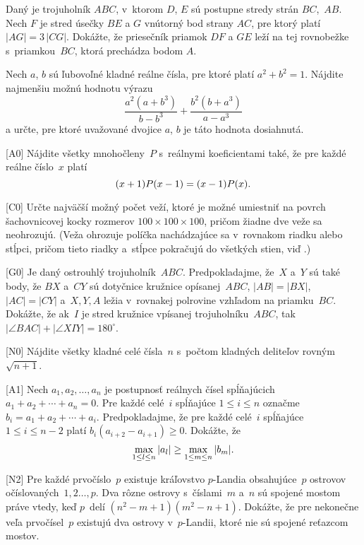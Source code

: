 {%
Daný je trojuholník $ABC$, v~ktorom $D$, $E$ sú postupne stredy
strán $BC$,~$AB$. Nech $F$ je stred úsečky $BE$
a $G$ vnútorný bod strany $AC$, pre ktorý platí $|AG|=3\,|CG|$.
Dokážte, že priesečník priamok $DF$ a $GE$ leží na tej rovnobežke
s~priamkou~$BC$, ktorá prechádza bodom $A$.
}

{%
Nech $a$, $b$ sú ľubovoľné kladné reálne čísla, pre ktoré platí $a^2+b^2=1$.
Nájdite najmenšiu možnú hodnotu výrazu
$$
\frac{a^2(a+b^3)}{b-b^3}+\frac{b^2(b+a^3)}{a-a^3}
$$
a určte, pre ktoré uvažované dvojice $a$, $b$ je táto hodnota dosiahnutá.}

{%
[A0]
Nájdite všetky mnohočleny~$P$ s~reálnymi koeficientami také, že pre každé reálne číslo~$x$ platí
$$
(x+1)P(x-1) = (x-1)P(x).
\belowdisplayskip0pt
$$}

{%
[C0]
Určte najväčší možný počet veží, ktoré je možné umiestniť na povrch šachovnicovej kocky rozmerov $100 \times 100 \times 100$, pričom žiadne dve veže sa neohrozujú. (Veža ohrozuje políčka nachádzajúce sa v~rovnakom riadku alebo stĺpci, pričom tieto riadky a~stĺpce pokračujú do všetkých stien, viď \obr.)
%
}

{%
[G0]
Je daný ostrouhlý trojuholník~$ABC$. Predpokladajme, že~$X$ a~$Y$ sú také body, že $BX$ a~$CY$ sú dotyčnice kružnice opísanej~$ABC$, $|AB|=|BX|$, $|AC|=|CY|$ a~$X,Y,A$ ležia v~rovnakej polrovine vzhľadom na priamku~$BC$. Dokážte, že ak~$I$ je stred kružnice vpísanej trojuholníku~$ABC$, tak $|\angle BAC| + |\angle XIY| = 180^\circ$.
}

{%
[N0]
Nájdite všetky kladné celé čísla~$n$ s~počtom kladných deliteľov rovným~$\sqrt{n+1}$.
}

{%
[A1]
Nech $a_1,a_2,\ldots,a_n$ je postupnosť reálnych čísel spĺňajúcich $a_1+a_2+\cdots+a_n=0$. Pre každé celé~$i$ spĺňajúce $1 \leq i\leq n$ označme $b_i=a_1+a_2+\cdots+a_i$. Predpokladajme, že pre každé celé~$i$ spĺňajúce $1 \leq i \leq n-2$ platí $b_i(a_{i+2}-a_{i+1}) \ge 0$. Dokážte, že
$$
\max_{1 \leq l \leq n} |a_l| \ge
\max_{1 \leq m \leq n} |b_m|.
\belowdisplayskip0pt
$$
}

{%
[N2]
Pre každé prvočíslo~$p$ existuje kráľovstvo $p$-Landia obsahujúce~$p$ ostrovov očíslovaných~$1,2\ldots,p$. Dva rôzne ostrovy s~číslami~$m$ a~$n$ sú spojené mostom práve vtedy, keď $p$~delí $(n^2-m+1)(m^2-n+1)$. Dokážte, že pre nekonečne veľa prvočísel~$p$ existujú dva ostrovy v~$p$-Landii, ktoré nie sú spojené reťazcom mostov.
}

